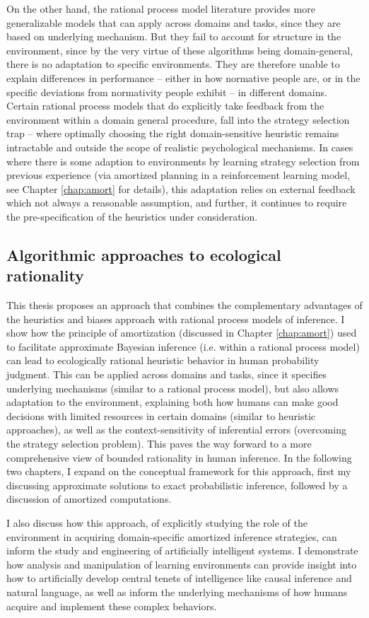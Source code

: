 On the other hand, the rational process model literature provides more generalizable models that can apply across domains and tasks, since they are based on underlying mechanism. But they fail to account for structure in the environment, since by the very virtue of these algorithms being domain-general, there is no adaptation to specific environments. They are therefore unable to explain differences in performance -- either in how normative people are, or in the specific deviations from normativity people exhibit -- in different domains. Certain rational process models that do explicitly take feedback from the environment within a domain general procedure, fall into the strategy selection trap -- where optimally choosing the right domain-sensitive heuristic remains intractable and outside the scope of realistic psychological mechanisms. In cases where there is some adaption to environments by learning strategy selection from previous experience (via amortized planning in a reinforcement learning model, see Chapter \ref{chap:amort} for details), this adaptation relies on external feedback which not always a reasonable assumption, and further, it continues to require the pre-specification of the heuristics under consideration.

\subsection{Algorithmic approaches to ecological rationality}

This thesis proposes an approach that combines the complementary advantages of the heuristics and biases approach with rational process models of inference. I show how the principle of amortization (discussed in Chapter \ref{chap:amort}) used to facilitate approximate Bayesian inference (i.e. within a rational process model) can lead to ecologically rational heuristic behavior in human probability judgment. This can be applied across domains and tasks, since it specifies underlying mechanisms (similar to a rational process model), but also allows adaptation to the environment, explaining both how humans can make good decisions with limited resources in certain domains (similar to heuristic approaches), as well as the context-sensitivity of inferential errors (overcoming the strategy selection problem). This paves the way forward to a more comprehensive view of bounded rationality in human inference. In the following two chapters, I expand on the conceptual framework for this approach, first my discussing approximate solutions to exact probabilistic inference, followed by a discussion of amortized computations.

I also discuss how this approach, of explicitly studying the role of the environment in acquiring domain-specific amortized inference strategies, can inform the study and engineering of artificially intelligent systems. I demonstrate how analysis and manipulation of learning environments can provide insight into how to artificially develop central tenets of intelligence like causal inference and natural language, as well as inform the underlying mechanisms of how humans acquire and implement these complex behaviors.
